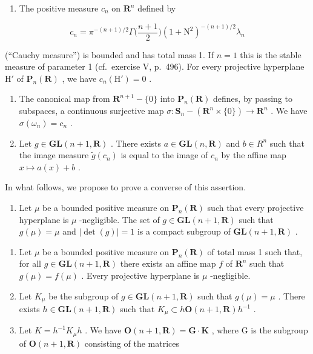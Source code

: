 \begin{enumerate}
\def\labelenumi{\alph{enumi})}
\tightlist
\item
  The positive measure \(c_{n}\) on \(\mathbf{R}^n\) defined by
\end{enumerate}

\[
c _ {n} = \pi^ {- (n + 1) / 2} \Gamma \Big (\frac {n + 1}{2} \Big) (1 + \mathrm{N} ^ {2}) ^ {- (n + 1) / 2} \lambda_ {n}
\]

(“Cauchy measure”) is bounded and has total mass 1. If \(n = 1\) this is the stable measure of parameter 1 (cf.~exercise V, p.~496). For every projective hyperplane \(\mathrm{H}'\) of \(\mathbf{P}_n(\mathbf{R})\) , we have \(c_n(\mathrm{H}') = 0\) .

\begin{enumerate}
\def\labelenumi{\alph{enumi})}
\setcounter{enumi}{1}
\item
  The canonical map from \(\mathbf{R}^{n+1} - \{0\}\) into \(\mathbf{P}_n(\mathbf{R})\) defines, by passing to subspaces, a continuous surjective map \(\sigma: \mathbf{S}_n - (\mathbf{R}^n \times \{0\}) \to \mathbf{R}^n\) . We have \(\sigma(\omega_n) = c_n\) .
\item
  Let \(g \in \mathbf{GL}(n+1, \mathbf{R})\) . There exists \(a \in \mathbf{GL}(n, \mathbf{R})\) and \(b \in R^n\) such that the image measure \(\widetilde{g}(c_n)\) is equal to the image of \(c_n\) by the affine map \(x \mapsto a(x) + b\) .
\end{enumerate}

In what follows, we propose to prove a converse of this assertion.

\begin{enumerate}
\def\labelenumi{\alph{enumi})}
\setcounter{enumi}{3}
\tightlist
\item
  Let \(\mu\) be a bounded positive measure on \(\mathbf{P}_{n}(\mathbf{R})\) such that every projective hyperplane is \(\mu\) -negligible. The set of \(g \in \mathbf{GL}(n+1, \mathbf{R})\) such that \(g(\mu) = \mu\) and \(|\det(g)| = 1\) is a compact subgroup of \(\mathbf{GL}(n+1, \mathbf{R})\) .

\end{enumerate}

\begin{enumerate}
\def\labelenumi{\alph{enumi})}
\setcounter{enumi}{4}
\item
  Let \(\mu\) be a bounded positive measure on \(\mathbf{P}_n(\mathbf{R})\) of total mass 1 such that, for all \(g \in \mathbf{GL}(n + 1, \mathbf{R})\) there exists an affine map \(f\) of \(\mathbf{R}^n\) such that \(g(\mu) = f(\mu)\) . Every projective hyperplane is \(\mu\) -negligible.
\item
  Let \(K_{\mu}\) be the subgroup of \(g \in \mathbf{GL}(n+1, \mathbf{R})\) such that \(g(\mu) = \mu\) . There exists \(h \in \mathbf{GL}(n+1, \mathbf{R})\) such that \(K_{\mu} \subset h \mathbf{O}(n+1, \mathbf{R}) h^{-1}\) .
\item
  Let \(K = h^{-1}K_{\mu}h\) . We have \(\mathbf{O}(n + 1, \mathbf{R}) = \mathbf{G} \cdot \mathbf{K}\) , where G is the subgroup of \(\mathbf{O}(n + 1, \mathbf{R})\) consisting of the matrices
\end{enumerate}

